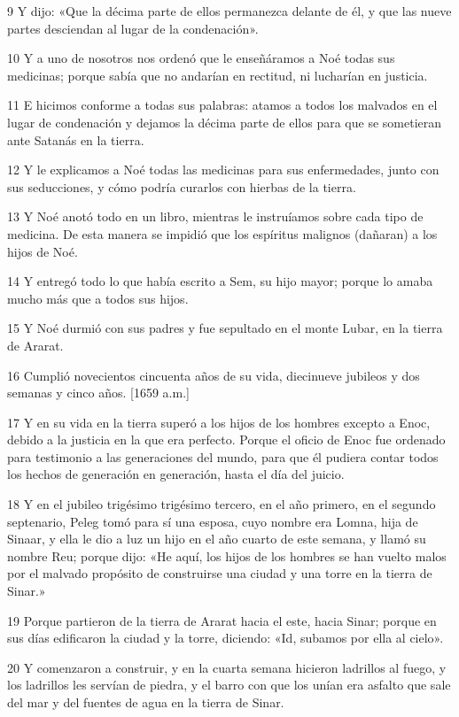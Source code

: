 \par 9 Y dijo: «Que la décima parte de ellos permanezca delante de él, y que las nueve partes desciendan al lugar de la condenación».
\par 10 Y a uno de nosotros nos ordenó que le enseñáramos a Noé todas sus medicinas; porque sabía que no andarían en rectitud, ni lucharían en justicia.
\par 11 E hicimos conforme a todas sus palabras: atamos a todos los malvados en el lugar de condenación y dejamos la décima parte de ellos para que se sometieran ante Satanás en la tierra.
\par 12 Y le explicamos a Noé todas las medicinas para sus enfermedades, junto con sus seducciones, y cómo podría curarlos con hierbas de la tierra.
\par 13 Y Noé anotó todo en un libro, mientras le instruíamos sobre cada tipo de medicina. De esta manera se impidió que los espíritus malignos (dañaran) a los hijos de Noé.
\par 14 Y entregó todo lo que había escrito a Sem, su hijo mayor; porque lo amaba mucho más que a todos sus hijos.
\par 15 Y Noé durmió con sus padres y fue sepultado en el monte Lubar, en la tierra de Ararat.
\par 16 Cumplió novecientos cincuenta años de su vida, diecinueve jubileos y dos semanas y cinco años. [1659 a.m.]
\par 17 Y en su vida en la tierra superó a los hijos de los hombres excepto a Enoc, debido a la justicia en la que era perfecto. Porque el oficio de Enoc fue ordenado para testimonio a las generaciones del mundo, para que él pudiera contar todos los hechos de generación en generación, hasta el día del juicio.
\par 18 Y en el jubileo trigésimo trigésimo tercero, en el año primero, en el segundo septenario, Peleg tomó para sí una esposa, cuyo nombre era Lomna, hija de Sinaar, y ella le dio a luz un hijo en el año cuarto de este semana, y llamó su nombre Reu; porque dijo: «He aquí, los hijos de los hombres se han vuelto malos por el malvado propósito de construirse una ciudad y una torre en la tierra de Sinar.»
\par 19 Porque partieron de la tierra de Ararat hacia el este, hacia Sinar; porque en sus días edificaron la ciudad y la torre, diciendo: «Id, subamos por ella al cielo».
\par 20 Y comenzaron a construir, y en la cuarta semana hicieron ladrillos al fuego, y los ladrillos les servían de piedra, y el barro con que los unían era asfalto que sale del mar y del fuentes de agua en la tierra de Sinar.
